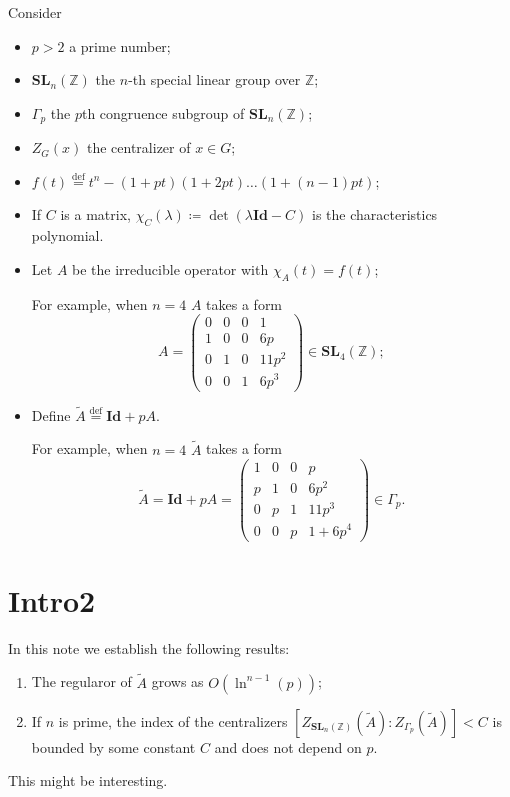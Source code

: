 \documentclass[a4paper]{article}
\newcommand{\eqdef}{\stackrel{\mathrm{def}}{=}}
\DeclareMathOperator{\assign}{\coloneqq}        %
\newcommand{\Id}{\mathbf{Id}}        %
\newcommand{\SLp}{\Gamma_p}        %
\newcommand{\SLn}{\mathbf{SL}_n(\mathbb{Z})}        %
\begin{document}
Consider
\begin{itemize}
\item $p > 2$ a prime number;
\item $\SLn$ the $n$-th special linear group over $\mathbb{Z}$;
\item $\SLp$ the $p$th congruence subgroup of $\SLn$;
\item $Z_G(x)$ the centralizer of $x \in G$;
\item $ f(t) \eqdef t^n - (1 + pt) (1 + 2pt) \ldots (1 + (n - 1) p t)$;
\item If $C$ is a matrix, $\chi_C(\lambda) \assign \det(\lambda \Id - C)$ is the characteristics polynomial.
\item Let $A$ be the irreducible operator with $\chi_A(t) = f(t)$; 

For example, when $n = 4$ $A$ takes a form
\begin{equation}
A = 
\begin{pmatrix}
0 & 0 & 0 & 1 \\
1 & 0 & 0 & 6 p \\
0 & 1 & 0 & 11 p^2 \\
0 & 0 & 1 & 6 p^3
\end{pmatrix}
\in {\mathbf{SL}_4(\mathbb{Z})};        %
\end{equation}
\item 
Define $\tilde A \eqdef \Id + p A$.

For example, when $n = 4$ $\tilde A$ takes a form
\begin{equation}
\tilde A = \Id + p A =
\begin{pmatrix}
1 & 0 & 0 & p \\
p & 1 & 0 & 6 p^2 \\
0 & p & 1 & 11 p^3 \\
0 & 0 & p & 1 + 6 p^4
\end{pmatrix}
\in \SLp.
\end{equation}
\end{itemize}

\section{Intro2}
In this note we establish the following results:
\begin{enumerate}
\item
The regularor of $\tilde A$
grows as $O (\ln^{n-1} (p)) $; 

\item
If $n$ is prime,
the index of the centralizers
$ [Z_{\SLn}(\tilde A) : Z_{\SLp}(\tilde A)] < C$
is bounded by some constant $C$ and does not depend on $p$.
\end{enumerate}
This might be interesting.
\end{document}
